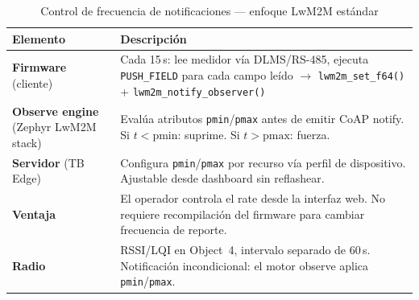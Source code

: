 \begin{table}[htbp]
\centering
\caption{Control de frecuencia de notificaciones --- enfoque LwM2M estándar}
\label{tab:rate-control}
\begin{tabular}{@{}p{2.5cm}p{11cm}@{}}
\toprule
\textbf{Elemento} & \textbf{Descripción} \\
\midrule
\textbf{Firmware} (cliente) & Cada 15\,s: lee medidor vía DLMS/RS-485, ejecuta \texttt{PUSH\_FIELD} para cada campo leído $\rightarrow$ \texttt{lwm2m\_set\_f64()} + \texttt{lwm2m\_notify\_observer()} \\
\addlinespace
\textbf{Observe engine} (Zephyr LwM2M stack) & Evalúa atributos \texttt{pmin}/\texttt{pmax} antes de emitir CoAP notify. Si $t < \text{pmin}$: suprime. Si $t > \text{pmax}$: fuerza. \\
\addlinespace
\textbf{Servidor} (TB Edge) & Configura \texttt{pmin}/\texttt{pmax} por recurso vía perfil de dispositivo. Ajustable desde dashboard sin reflashear. \\
\addlinespace
\textbf{Ventaja} & El operador controla el rate desde la interfaz web. No requiere recompilación del firmware para cambiar frecuencia de reporte. \\
\addlinespace
\textbf{Radio} & RSSI/LQI en Object~4, intervalo separado de 60\,s. Notificación incondicional: el motor observe aplica \texttt{pmin}/\texttt{pmax}. \\
\bottomrule
\end{tabular}
\end{table}
